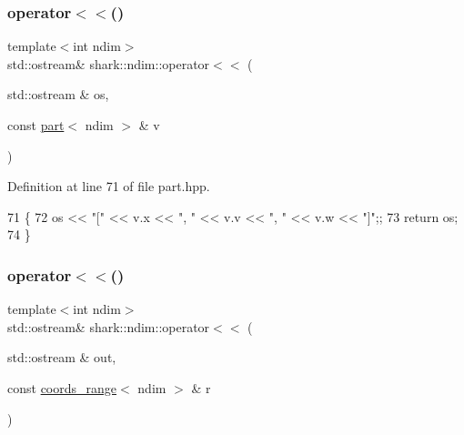\hypertarget{namespaceshark_1_1ndim_a89ddd7f1cfd6236c1220b92c2e2bdc66}{}\label{namespaceshark_1_1ndim_a89ddd7f1cfd6236c1220b92c2e2bdc66} 
\subsubsection{\texorpdfstring{operator$<$$<$()}{operator<<()}\hspace{0.1cm}{\footnotesize\ttfamily [2/5]}}
{\footnotesize\ttfamily template$<$int ndim$>$ \\
std\+::ostream\& shark\+::ndim\+::operator$<$$<$ (\begin{DoxyParamCaption}\item[{std\+::ostream \&}]{os,  }\item[{const \hyperlink{structshark_1_1ndim_1_1part}{part}$<$ ndim $>$ \&}]{v }\end{DoxyParamCaption})\hspace{0.3cm}{\ttfamily [inline]}}



Definition at line 71 of file part.\+hpp.


\begin{DoxyCode}
71                                                                                 \{
72                         os << \textcolor{stringliteral}{"["} << v.x << \textcolor{stringliteral}{", "} << v.v << \textcolor{stringliteral}{", "} << v.w << \textcolor{stringliteral}{"]"};;
73             \textcolor{keywordflow}{return} os;
74         \}
\end{DoxyCode}
\hypertarget{namespaceshark_1_1ndim_a8004c988b27d071901f9f5f465b96a72}{}\label{namespaceshark_1_1ndim_a8004c988b27d071901f9f5f465b96a72} 
\subsubsection{\texorpdfstring{operator$<$$<$()}{operator<<()}\hspace{0.1cm}{\footnotesize\ttfamily [3/5]}}
{\footnotesize\ttfamily template$<$int ndim$>$ \\
std\+::ostream\& shark\+::ndim\+::operator$<$$<$ (\begin{DoxyParamCaption}\item[{std\+::ostream \&}]{out,  }\item[{const \hyperlink{structshark_1_1ndim_1_1coords__range}{coords\+\_\+range}$<$ ndim $>$ \&}]{r }\end{DoxyParamCaption})}

